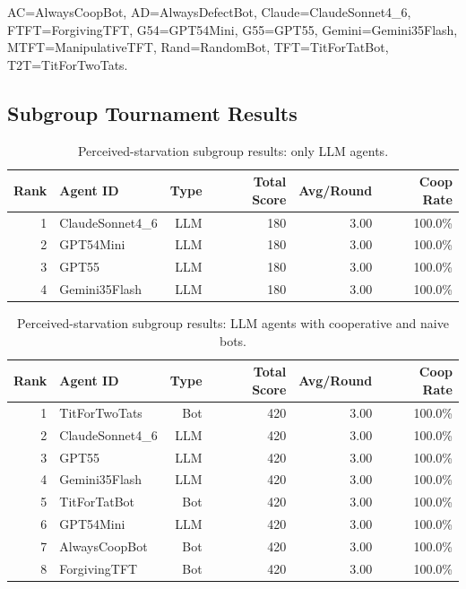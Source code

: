 \documentclass[11pt]{article}
\begin{document}
\begin{table}[H]
\vspace{0.3em}
\begin{flushleft}
\scriptsize
AC=AlwaysCoopBot, AD=AlwaysDefectBot, Claude=ClaudeSonnet4\_6, FTFT=ForgivingTFT, G54=GPT54Mini, G55=GPT55, Gemini=Gemini35Flash, MTFT=ManipulativeTFT, Rand=RandomBot, TFT=TitForTatBot, T2T=TitForTwoTats.
\end{flushleft}
\end{table}

\subsection{Subgroup Tournament Results}

\begin{table}[H]
\centering
\caption{Perceived-starvation subgroup results: only LLM agents.}
\label{tab:starvation_subgroup_llm_only}
\begin{tabular}{rlrrrr}
\toprule
Rank & Agent ID & Type & Total Score & Avg/Round & Coop Rate \\
\midrule
1 & ClaudeSonnet4\_6 & LLM & 180 & 3.00 & 100.0\% \\
2 & GPT54Mini & LLM & 180 & 3.00 & 100.0\% \\
3 & GPT55 & LLM & 180 & 3.00 & 100.0\% \\
4 & Gemini35Flash & LLM & 180 & 3.00 & 100.0\% \\
\bottomrule
\end{tabular}
\end{table}

\begin{table}[H]
\centering
\caption{Perceived-starvation subgroup results: LLM agents with cooperative and naive bots.}
\label{tab:starvation_subgroup_llm_cooperative}
\begin{tabular}{rlrrrr}
\toprule
Rank & Agent ID & Type & Total Score & Avg/Round & Coop Rate \\
\midrule
1 & TitForTwoTats & Bot & 420 & 3.00 & 100.0\% \\
2 & ClaudeSonnet4\_6 & LLM & 420 & 3.00 & 100.0\% \\
3 & GPT55 & LLM & 420 & 3.00 & 100.0\% \\
4 & Gemini35Flash & LLM & 420 & 3.00 & 100.0\% \\
5 & TitForTatBot & Bot & 420 & 3.00 & 100.0\% \\
6 & GPT54Mini & LLM & 420 & 3.00 & 100.0\% \\
7 & AlwaysCoopBot & Bot & 420 & 3.00 & 100.0\% \\
8 & ForgivingTFT & Bot & 420 & 3.00 & 100.0\% \\
\bottomrule
\end{tabular}
\end{table}
\end{document}
